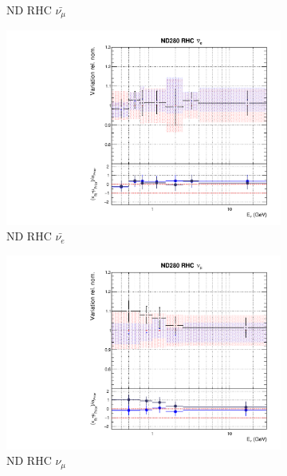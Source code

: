 \begin{figure}[t]
\begin{subfigure}{0.24\textwidth}
  \caption{ND RHC $\bar{\nu_{\mu}}$}
  \label{fig:}
\end{subfigure}
\begin{subfigure}{0.24\textwidth}
  \centering
  \includegraphics[width=0.95\linewidth]{figs/rhcmpdat28flux_5}
  \caption{ND RHC $\bar{\nu_e}$}
  \label{fig:}
\end{subfigure}
\begin{subfigure}{0.24\textwidth}
  \centering
  \includegraphics[width=0.95\linewidth]{figs/rhcmpdat28flux_6}
  \caption{ND RHC $\nu_{\mu}$}
  \label{fig:}
\end{subfigure}
\vspace{15mm}
\begin{subfigure}{0.24\textwidth}
  \centering

\end{subfigure}
\end{figure}
